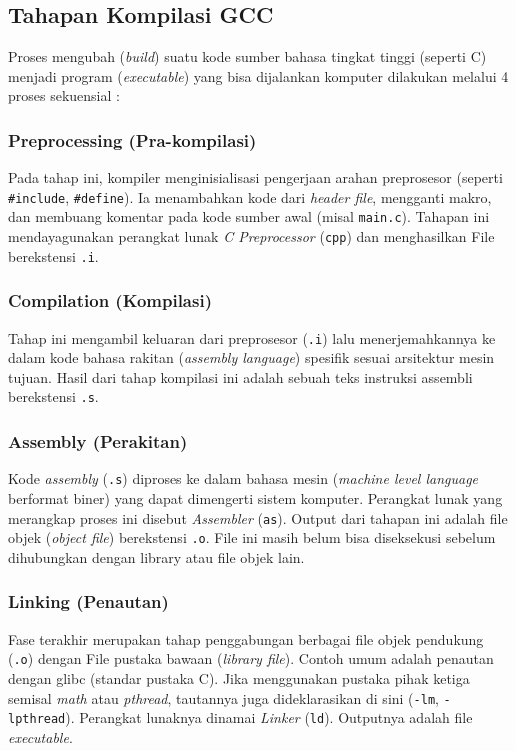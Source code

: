 \subsection{Tahapan Kompilasi GCC}
Proses mengubah (\textit{build}) suatu kode sumber bahasa tingkat tinggi (seperti C) menjadi program (\textit{executable}) yang bisa dijalankan komputer dilakukan melalui 4 proses sekuensial \cite{bryant2015computer}:

\subsubsection{Preprocessing (Pra-kompilasi)}
Pada tahap ini, kompiler menginisialisasi pengerjaan arahan preprosesor (seperti \texttt{\#include}, \texttt{\#define}). Ia menambahkan kode dari \textit{header file}, mengganti makro, dan membuang komentar pada kode sumber awal (misal \texttt{main.c}). Tahapan ini mendayagunakan perangkat lunak \textit{C Preprocessor} (\texttt{cpp}) dan menghasilkan File berekstensi \texttt{.i}.

\subsubsection{Compilation (Kompilasi)}
Tahap ini mengambil keluaran dari preprosesor (\texttt{.i}) lalu menerjemahkannya ke dalam kode bahasa rakitan (\textit{assembly language}) spesifik sesuai arsitektur mesin tujuan. Hasil dari tahap kompilasi ini adalah sebuah teks instruksi assembli berekstensi \texttt{.s}.

\subsubsection{Assembly (Perakitan)}
Kode \textit{assembly} (\texttt{.s}) diproses ke dalam bahasa mesin (\textit{machine level language} berformat biner) yang dapat dimengerti sistem komputer. Perangkat lunak yang merangkap proses ini disebut \textit{Assembler} (\texttt{as}). Output dari tahapan ini adalah file objek (\textit{object file}) berekstensi \texttt{.o}. File ini masih belum bisa diseksekusi sebelum dihubungkan dengan library atau file objek lain.

\subsubsection{Linking (Penautan)}
Fase terakhir merupakan tahap penggabungan berbagai file objek pendukung (\texttt{.o}) dengan File pustaka bawaan (\textit{library file}). Contoh umum adalah penautan dengan glibc (standar pustaka C). Jika menggunakan pustaka pihak ketiga semisal \textit{math} atau \textit{pthread}, tautannya juga dideklarasikan di sini (\texttt{-lm}, \texttt{-lpthread}). Perangkat lunaknya dinamai \textit{Linker} (\texttt{ld}). Outputnya adalah file \textit{executable}.

